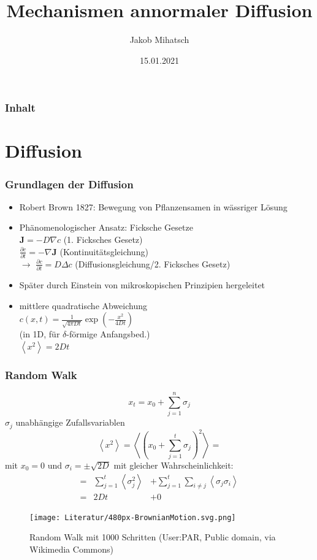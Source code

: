\documentclass{beamer}
\title{Mechanismen annormaler Diffusion}
\author[J. Mihatsch]{Jakob Mihatsch}
\institute{Universität Greifswald}%
\date{15.01.2021}
\begin{document}
	\begin{frame}
		\titlepage
	\end{frame}
\begin{frame}
	\frametitle{Inhalt}
	\tableofcontents
\end{frame}
\section{Diffusion}
{ %
	\begin{frame}
		\frametitle{Grundlagen der Diffusion}
		\begin{itemize}
			\item Robert Brown 1827: Bewegung von Pflanzensamen in wässriger Lösung
			\item Phänomenologischer Ansatz: Ficksche Gesetze \\
			$\mathbf{J} = -D \nabla c $ (1. Ficksches Gesetz) \\
			$\frac{\partial c}{\partial t} = -\nabla \mathbf{J} $ (Kontinuitätsgleichung) \\
			$\rightarrow$ $\boxed{\frac{\partial c}{\partial t} = D \Delta c}$ (Diffusionsgleichung/2. Ficksches Gesetz)
			
			\item Später durch Einstein von mikroskopischen Prinzipien hergeleitet
			\item mittlere quadratische Abweichung\\
			$c(x, t) = \frac{1}{\sqrt{4\pi D t}}\exp(-\frac{x^2}{4Dt})$ \\(in 1D, für $\delta$-förmige Anfangsbed.)\\
			$\boxed{\left<x^2\right> = 2Dt}$
		\end{itemize}
	\end{frame}
}
	\begin{frame}
		\frametitle{Random Walk}
		\begin{equation*}x_t = x_0 + \sum_{j=1}^n \sigma_j\end{equation*}
		$\sigma_j$ unabhängige Zufallsvariablen
		\begin{equation*}\left<x^2\right> = \left< \left(x_0 + \sum_{j=1}^t \sigma_j\right)^2 \right> = \end{equation*}
		mit $x_0=0$ und $\sigma_i = \pm \sqrt{2D}$ mit gleicher Wahrscheinlichkeit:
		\begin{eqnarray*} = &\sum_{j=1}^t \left<\sigma_j^2\right> &+ \sum_{j=1}^t \sum_{i\neq j} \left<\sigma_j \sigma_i\right> \\
		= &2Dt &+ 0 \end{eqnarray*}
		\begin{figure}
			\raggedleft
			\vspace*{-1cm}
			\texttt{[image: Literatur/480px-BrownianMotion.svg.png]}
			\caption{Random Walk mit 1000 Schritten (User:PAR, Public domain, via Wikimedia Commons)}
		\end{figure}
	\end{frame}
\end{document}
